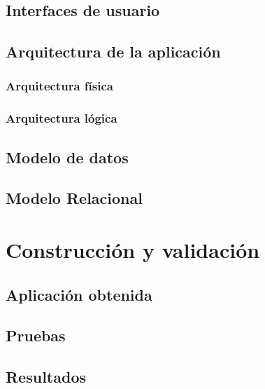 \documentclass{iccmemoria}
\begin{document}
	\section{Interfaces de usuario}
	

	\section{Arquitectura de la aplicación}
	

		\subsection{Arquitectura física}
		

		\subsection{Arquitectura lógica}
		\label{sec:Arquitectura_Logica}
		

	\section{Modelo de datos}
	

	\section{Modelo Relacional}
	


\chapter{Construcción y validación}


	\section{Aplicación obtenida}
	

	\section{Pruebas}

	\section{Resultados}
\end{document}
